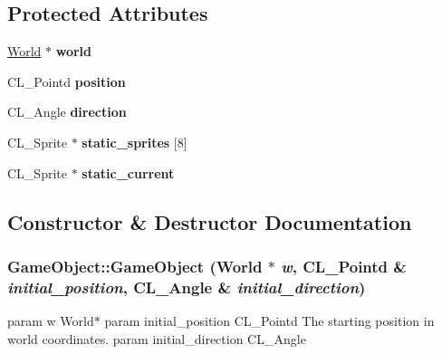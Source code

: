 \subsection*{Protected Attributes}
\begin{DoxyCompactItemize}
\item 
\hypertarget{classGameObject_adce5bc0f31d7ce307f6bf8fe57030a24}{
\hyperlink{classWorld}{World} $\ast$ {\bfseries world}}
\label{classGameObject_adce5bc0f31d7ce307f6bf8fe57030a24}

\item 
\hypertarget{classGameObject_a9e3a44174a06dd260412d7a13d639d99}{
CL\_\-Pointd {\bfseries position}}
\label{classGameObject_a9e3a44174a06dd260412d7a13d639d99}

\item 
\hypertarget{classGameObject_a8df0dc007367b180dfcd9d2f193f6bdf}{
CL\_\-Angle {\bfseries direction}}
\label{classGameObject_a8df0dc007367b180dfcd9d2f193f6bdf}

\item 
\hypertarget{classGameObject_a5b841978ecf469bc3a69c0d05ad81013}{
CL\_\-Sprite $\ast$ {\bfseries static\_\-sprites} \mbox{[}8\mbox{]}}
\label{classGameObject_a5b841978ecf469bc3a69c0d05ad81013}

\item 
\hypertarget{classGameObject_a22464434abaabf3fb9aab0664dd22eb5}{
CL\_\-Sprite $\ast$ {\bfseries static\_\-current}}
\label{classGameObject_a22464434abaabf3fb9aab0664dd22eb5}

\end{DoxyCompactItemize}


\subsection{Constructor \& Destructor Documentation}
\hypertarget{classGameObject_ad8d1bdb3864097a3723ddac03b947f95}{
\subsubsection[{GameObject}]{\setlength{\rightskip}{0pt plus 5cm}GameObject::GameObject ({\bf World} $\ast$ {\em w}, \/  CL\_\-Pointd \& {\em initial\_\-position}, \/  CL\_\-Angle \& {\em initial\_\-direction})}}
\label{classGameObject_ad8d1bdb3864097a3723ddac03b947f95}
param w World$\ast$ param initial\_\-position CL\_\-Pointd The starting position in world coordinates. param initial\_\-direction CL\_\-Angle 

